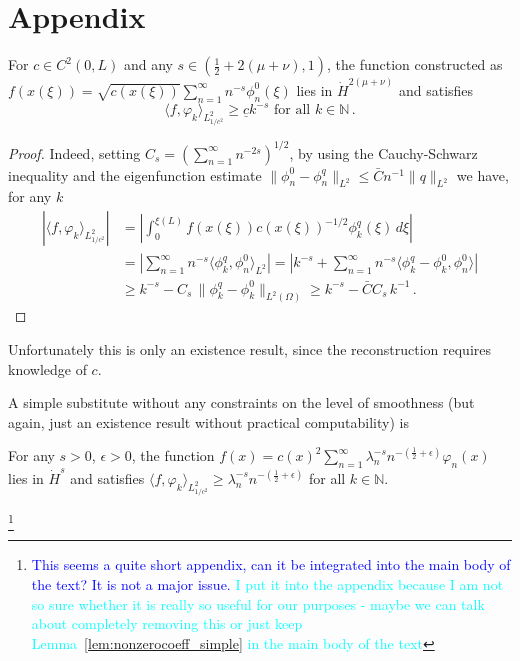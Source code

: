 \section*{Appendix}
\begin{lemma}\label{lem:nonzerocoeff}
For $c\in C^2(0,L)$ and any $s\in(\frac12+2(\mu+\nu),1)$, the function constructed as 
$f(x(\xi))=\sqrt{c(x(\xi))} \sum_{n=1}^\infty n^{-s} \phi_n^0(\xi)$ lies in $\dot{H}^{2(\mu+\nu)}$ and satisfies 
\[
\langle f,\varphi_k\rangle_{L^2_{1/c^2}}  \geq \underline{c}k^{-s} \mbox{ for all }k\in\mathbb{N}\,.
\]
\end{lemma}
\begin{proof}
Indeed, setting $C_s=\left(\sum_{n=1}^\infty n^{-2s}\right)^{1/2}$, by using the Cauchy-Schwarz inequality and the eigenfunction estimate %
$\|\phi_n^0 -\phi_n^q\|_{L^2}\leq\bar{C}n^{-1}\|q\|_{L^2}$ we have, for any $k$ 
\[
\begin{aligned}
|\langle f,\varphi_k\rangle_{L^2_{1/c^2}}| 
&= |\int_0^{\xi(L)} f(x(\xi)) c(x(\xi))^{-1/2} \phi_k^q(\xi)\, d\xi|\\
&=|\sum_{n=1}^\infty n^{-s} \langle \phi_k^q, \phi_n^0\rangle_{L^2}|
=|k^{-s}+\sum_{n=1}^\infty n^{-s}\langle \phi_k^q-\phi_k^0, \phi_n^0\rangle|\\
&\geq k^{-s}-C_s\, \|\phi_k^q-\phi_k^0\|_{L^2(\Omega)}
\geq k^{-s}-\bar{C}C_s\, k^{-1}\,.
\end{aligned}
\]
\end{proof}
Unfortunately this is only an existence result, since the reconstruction requires knowledge of $c$.

A simple substitute without any constraints on the level of smoothness (but again, just an existence result without practical computability) is
\begin{lemma}\label{lem:nonzerocoeff_simple}
For any $s>0$, $\epsilon>0$, the function 
$f(x)=c(x)^2\sum_{n=1}^\infty \lambda_n^{-s} n^{-(\frac12+\epsilon)} \varphi_n(x)$ lies in $\dot{H}^{s}$ and satisfies 
$\langle f,\varphi_k\rangle_{L^2_{1/c^2}}  \geq \lambda_n^{-s} n^{-(\frac12+\epsilon)} $ for all $k\in\mathbb{N}$.
\end{lemma}

\footnote{\textcolor{blue}{This seems a quite short appendix, can it be integrated into
the main body of the text?  It is not a major issue.}
\textcolor{cyan}{I put it into the appendix because I am not so sure whether it is really so useful for our purposes - maybe we can talk about completely removing this or just keep Lemma~\eqref{lem:nonzerocoeff_simple} in the main body of the text}}

